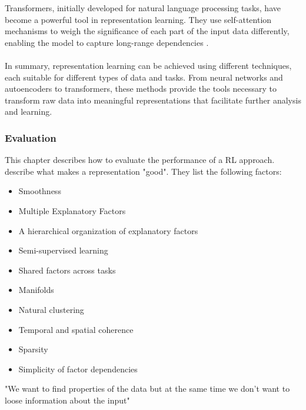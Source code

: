 Transformers, initially developed for natural language processing tasks, have become a powerful tool in representation learning. They use self-attention mechanisms to weigh the significance of each part of the input data differently, enabling the model to capture long-range dependencies \cite{vaswani_attention_2017}.\\\\
In summary, representation learning can be achieved using different techniques, each suitable for different types of data and tasks. From neural networks and autoencoders to transformers, these methods provide the tools necessary to transform raw data into meaningful representations that facilitate further analysis and learning.
\subsubsection{Evaluation}\label{theory:evaluation}
This chapter describes how to evaluate the performance of a RL approach.
 describe what makes a representation "good". They list the following factors:
\begin{itemize}
  \item Smoothness
  \item Multiple Explanatory Factors
  \item A hierarchical organization of explanatory factors
  \item Semi-supervised learning
  \item Shared factors across tasks
  \item Manifolds
  \item Natural clustering
  \item Temporal and spatial coherence
  \item Sparsity
  \item Simplicity of factor dependencies
\end{itemize}
"We want to find properties of the data but at the same time we don't want to loose information about the input" \cite[S. 525]{goodfellow_deep_2016}
